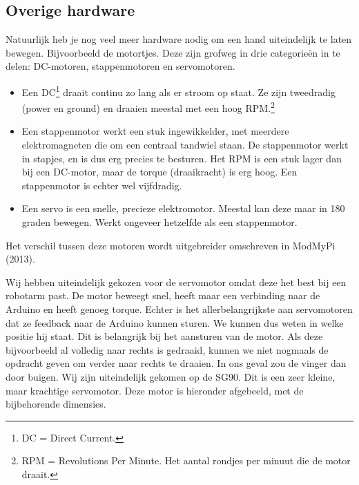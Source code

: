 \hypertarget{overige-hardware}{%
\subsection{Overige hardware}\label{overige-hardware}}

Natuurlijk heb je nog veel meer hardware nodig om een hand uiteindelijk
te laten bewegen. Bijvoorbeeld de motortjes. Deze zijn grofweg in drie
categorieën in te delen: DC-motoren, stappenmotoren en servomotoren.

\begin{itemize}
\tightlist
\item
  Een DC\footnote{DC = Direct Current.} draait continu zo lang als er
  stroom op staat. Ze zijn tweedradig (power en ground) en draaien
  meestal met een hoog RPM.\footnote{RPM = Revolutions Per Minute. Het
    aantal rondjes per minuut die de motor draait.}
\end{itemize}

\begin{itemize}
\item
  Een stappenmotor werkt een stuk ingewikkelder, met meerdere
  elektromagneten die om een centraal tandwiel staan. De stappenmotor
  werkt in stapjes, en is dus erg precies te besturen. Het RPM is een
  stuk lager dan bij een DC-motor, maar de torque (draaikracht) is erg
  hoog. Een stappenmotor is echter wel vijfdradig.
\item
  Een servo is een snelle, precieze elektromotor. Meestal kan deze maar
  in 180 graden bewegen. Werkt ongeveer hetzelfde als een stappenmotor.
\end{itemize}

Het verschil tussen deze motoren wordt uitgebreider omschreven in
ModMyPi (2013).

Wij hebben uiteindelijk gekozen voor de servomotor omdat deze het best
bij een robotarm past. De motor beweegt snel, heeft maar een verbinding
naar de Arduino en heeft genoeg torque. Echter is het allerbelangrijkste
aan servomotoren dat ze feedback naar de Arduino kunnen sturen. We
kunnen dus weten in welke positie hij staat. Dit is belangrijk bij het
aansturen van de motor. Als deze bijvoorbeeld al volledig naar rechts is
gedraaid, kunnen we niet nogmaals de opdracht geven om verder naar
rechts te draaien. In ons geval zou de vinger dan door buigen. Wij zijn
uiteindelijk gekomen op de SG90. Dit is een zeer kleine, maar krachtige
servomotor. Deze motor is hieronder afgebeeld, met de bijbehorende
dimensies.

